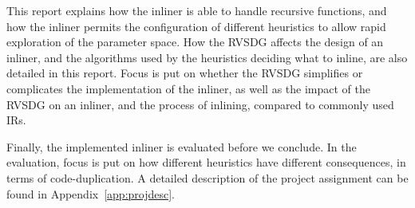 
This report explains how the inliner is able to handle recursive functions, and
how the inliner permits the configuration of different heuristics to allow rapid
exploration of the parameter space. How the RVSDG affects the design of an
inliner, and the algorithms used by the heuristics deciding what to inline, are
also detailed in this report. Focus is put on whether the RVSDG simplifies or
complicates the implementation of the inliner, as well as the impact of the
RVSDG on an inliner, and the process of inlining, compared to commonly used IRs.

Finally, the implemented inliner is evaluated before we conclude. In the
evaluation, focus is put on how different heuristics have different
consequences, in terms of code-duplication. A detailed description of the
project assignment can be found in Appendix~\ref{app:projdesc}.
